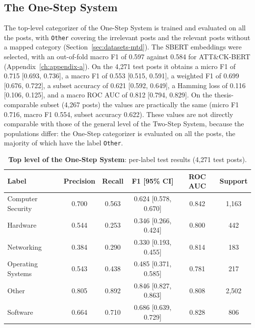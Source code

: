 \subsection{The One-Step System}\label{subsec:one-step-system-imp-and-rsl}
The top-level categorizer of the One-Step System is trained and evaluated on all the posts, with \texttt{Other} covering the irrelevant posts and the relevant posts without a mapped category (Section~\ref{sec:datasets-mtd}). The SBERT embeddings were selected, with an out-of-fold macro F1 of 0.597 against 0.584 for ATT{\&}CK-BERT (Appendix~\ref{ch:appendix-a}). On the 4,271 test posts it obtains a micro F1 of 0.715 [0.693, 0.736], a macro F1 of 0.553 [0.515, 0.591], a weighted F1 of 0.699 [0.676, 0.722], a subset accuracy of 0.621 [0.592, 0.649], a Hamming loss of 0.116 [0.106, 0.125], and a macro ROC AUC of 0.812 [0.794, 0.829]. On the thesis-comparable subset (4,267 posts) the values are practically the same (micro F1 0.716, macro F1 0.554, subset accuracy 0.622). These values are not directly comparable with those of the general level of the Two-Step System, because the populations differ: the One-Step categorizer is evaluated on all the posts, the majority of which have the label \texttt{Other}.

\begin{table}
    \centering
    \caption{\textbf{Top level of the One-Step System}: per-label test results (4,271 test posts).}
    \label{tab:one-step-system}
    \small
    \begin{tabular}{lccccc}
        \hline
        \textbf{Label} & \textbf{Precision} & \textbf{Recall} & \textbf{F1 [95{\%} CI]} & \textbf{ROC AUC} & \textbf{Support} \\
        \hline
        Computer Security & 0.700 & 0.563 & 0.624 [0.578, 0.670] & 0.842 & 1,163 \\
        Hardware & 0.544 & 0.253 & 0.346 [0.266, 0.424] & 0.800 & 442 \\
        Networking & 0.384 & 0.290 & 0.330 [0.193, 0.455] & 0.814 & 183 \\
        Operating Systems & 0.543 & 0.438 & 0.485 [0.371, 0.585] & 0.781 & 217 \\
        Other & 0.805 & 0.892 & 0.846 [0.827, 0.863] & 0.808 & 2,502 \\
        Software & 0.664 & 0.710 & 0.686 [0.639, 0.729] & 0.828 & 806 \\
        \hline
    \end{tabular}
\end{table}

